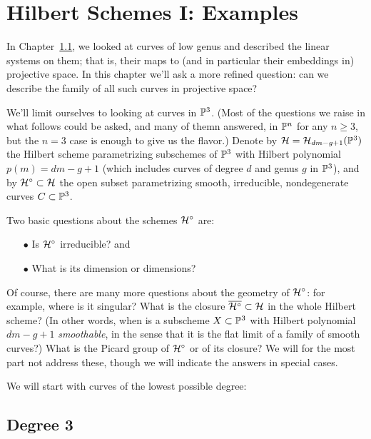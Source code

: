 

\chapter{Hilbert Schemes I: Examples}
\label{HilbertSchemesChapter}

In Chapter~\ref{}, we looked at curves of low genus and described the linear systems on them; that is, their maps to (and in particular their embeddings in) projective space. In this chapter we'll ask a more refined question: can we describe the family of all such curves in projective space?


We'll limit ourselves to looking at curves in ${\mathbb P}^3$. (Most of the questions we raise in what follows could be asked, and many of themn answered, in ${\mathbb P}^n$ for any $n \geq 3$, but the $n=3$ case is enough to give us the flavor.) Denote by ${\cal H} = {\cal H}_{dm-g+1}({\mathbb P}^3)$ the Hilbert scheme parametrizing subschemes of ${\mathbb P}^3$ with Hilbert polynomial $p(m) = dm-g+1$ (which includes
curves of degree $d$ and genus $g$ in ${\mathbb P}^3$), and by ${\cal H}^\circ \subset {\cal H}$ the open subset parametrizing smooth, irreducible, nondegenerate curves $C \subset {\mathbb P}^3$. 

Two basic questions about the schemes ${\cal H}^\circ$ are:

\begin{enumerate}
\item[$\bullet$] Is ${\cal H}^\circ$ irreducible? and
\item[$\bullet$]  What is its dimension or dimensions?
\end{enumerate}

Of course, there are many more questions about the geometry of ${\cal H}^\circ$: for example,  where is it singular? What is the closure $\overline{{\cal H}^\circ} \subset {\cal H}$ in the whole Hilbert scheme? (In other words, when is a subscheme $X \subset {\mathbb P}^3$ with Hilbert polynomial $dm-g+1$ \emph{smoothable}, in the sense that it is the flat limit of a family of smooth curves?) What is the Picard group of ${\cal H}^\circ$ or of its closure? We will for the most part not address these, though we will indicate the answers in special cases.

We will start with curves of the lowest possible degree:

\section{Degree 3}

